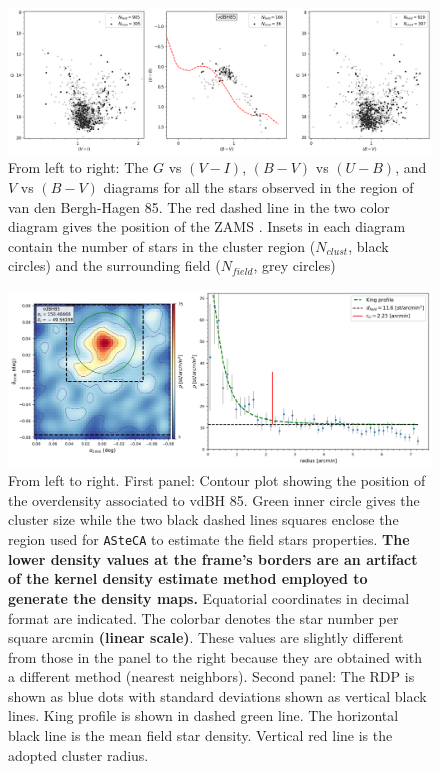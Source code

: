 \documentclass[draft]{aa}
\begin{document}
\begin{figure}[ht]
    \centering
    \includegraphics[width=\hsize]{../figs/obs_vdBH85.png}
\caption{From left to right: The $G$ vs $(V-I)$, $(B-V)$ vs $(U-B)$, and
$V$ vs $(B-V)$ diagrams for all the stars observed in the region of van
den Bergh-Hagen 85.
The red dashed line in the two color diagram gives the position of the ZAMS
\citep{Aller1982}. Insets in each diagram contain the number of stars 
in the cluster region ($N_{clust}$, black circles) and the surrounding
field ($N_{field}$, grey circles)
}
    \label{fig:photom_vdBH85} %
\end{figure}

\begin{figure}[ht]
    \centering
    \includegraphics[width=\hsize]{../figs/dmap_vdbh85.png}
\caption{From left to right. First panel:
Contour plot showing the position of the overdensity associated to vdBH 85.
Green inner circle gives the cluster size while the two black dashed lines
squares enclose the region used for \texttt{ASteCA} to estimate the field stars
properties. \textbf{The lower density values at the frame's borders are an
artifact of the kernel density estimate method employed to generate the density
maps.}
Equatorial coordinates in decimal format are indicated.
The colorbar denotes the star number per square arcmin \textbf{(linear scale)}.
These values are slightly different from those in the panel to the right
because they are obtained with a different method (nearest neighbors).
%
Second panel: The RDP is shown as blue dots with standard deviations shown as
vertical black lines. King profile is shown in dashed green line. The
horizontal black line is the mean field star density. Vertical red line is the
adopted cluster radius.
}
    \label{fig:struct_vdBH85}
\end{figure}
\end{document}
